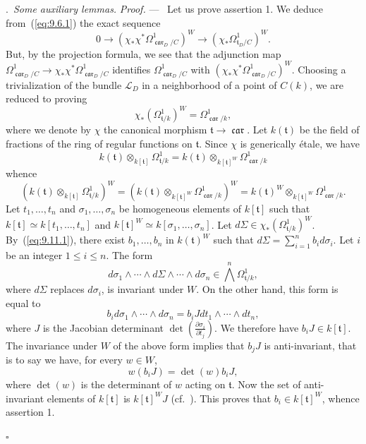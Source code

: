 \documentclass[12pt,a4paper,oneside,english,leqno]{smfart}
\makeatletter
\numberwithin{equation}{subsection}
\numberwithin{theo}{subsection}
\newenvironment{paragr}[1][]{\medskip\refstepcounter{subsection}%
  \par\noindent\hspace*{\parindent}\thesubsection.\ \emph{#1}%
  \@ifundefined{@empty}{}{}\ignorespaces}{\medskip}
\theoremstyle{plain}
\theoremstyle{definition}
\theoremstyle{remark}
\newenvironment{preuve}[1][]{\medskip\noindent\textit{Proof.} #1 ---\ }%
  {\hfill\ensuremath{\square}\medskip}
\DeclareMathOperator{\car}{\mathfrak{car}}
\newcommand{\lc}{\mathcal{L}}
\newcommand{\tgo}{\mathfrak{t}}
\renewcommand{\leq}{\leqslant}
\makeatother
\begin{document}
\begin{paragr}[Some auxiliary lemmas.]
\begin{preuve}
Let us prove assertion 1. We deduce from~(\ref{eq:9.6.1}) the exact sequence
$$0\longrightarrow(\chi_*\chi^*\Omega^1_{\car_D/C})^W\longrightarrow(\chi_*\Omega^1_{\tgo_D/C})^W.$$
But, by the projection formula, we see that the adjunction map $\Omega^1_{\car_D/C}\to\chi_*\chi^*\Omega^1_{\car_D/C}$ identifies $\Omega^1_{\car_D/C}$ with $(\chi_*\chi^*\Omega^1_{\car_D/C})^W$. Choosing a trivialization of the bundle $\lc_D$ in a neighborhood of a point of $C(k)$, we are reduced to proving
$$\chi_*(\Omega^1_{\tgo/k})^W=\Omega^1_{\car/k},$$
where we denote by $\chi$ the canonical morphism $\tgo\to\car$. Let $k(\tgo)$ be the field of fractions of the ring of regular functions on $\tgo$. Since $\chi$ is generically \'etale, we have
$$k(\tgo)\otimes_{k[\tgo]}\Omega^1_{\tgo/k}=k(\tgo)\otimes_{k[\tgo]^W}\Omega^1_{\car/k}$$
whence
\begin{equation}\label{eq:9.11.1}
(k(\tgo)\otimes_{k[\tgo]}\Omega^1_{\tgo/k})^W=(k(\tgo)\otimes_{k[\tgo]^W}\Omega^1_{\car/k})^W=k(\tgo)^W\otimes_{k[\tgo]^W}\Omega^1_{\car/k}.
\end{equation}
Let $t_1,\ldots,t_n$ and $\sigma_1,\ldots,\sigma_n$ be homogeneous elements of $k[\tgo]$ such that $k[\tgo]\simeq k[t_1,\ldots,t_n]$ and $k[\tgo]^W\simeq k[\sigma_1,\ldots,\sigma_n]$. Let $d\Sigma\in\chi_*(\Omega^1_{\tgo/k})^W$. By~(\ref{eq:9.11.1}), there exist $b_1,\ldots,b_n$ in $k(\tgo)^W$ such that $d\Sigma=\sum_{i=1}^nb_id\sigma_i$. Let $i$ be an integer $1\leq i\leq n$. The form
$$d\sigma_1\wedge\cdots\wedge d\Sigma\wedge\cdots\wedge d\sigma_n\in\bigwedge^n\Omega^1_{\tgo/k},$$
where $d\Sigma$ replaces $d\sigma_i$, is invariant under $W$. On the other hand, this form is equal to
$$b_id\sigma_1\wedge\cdots\wedge d\sigma_n=b_iJdt_1\wedge\cdots\wedge dt_n,$$
where $J$ is the Jacobian determinant $\det(\frac{\partial\sigma_i}{\partial t_j})$. We therefore have $b_iJ\in k[\tgo]$. The invariance under $W$ of the above form implies that $b_jJ$ is anti-invariant, that is to say we have, for every $w\in W$,
$$w(b_iJ)=\det(w)b_iJ,$$
where $\det(w)$ is the determinant of $w$ acting on $\tgo$. Now the set of anti-invariant elements of $k[\tgo]$ is $k[\tgo]^WJ$ (cf.\ \cite[Prop.~6, Chap.~V]{Bourbaki}). This proves that $b_i\in k[\tgo]^W$, whence assertion 1.


\end{preuve}
\end{paragr}
\end{document}
